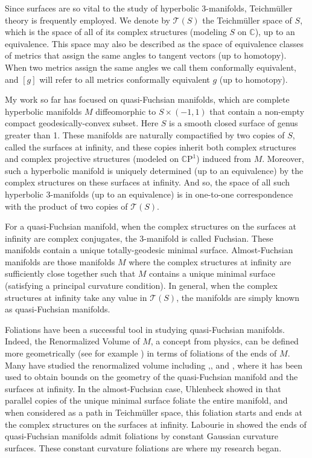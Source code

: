 \documentclass[11pt]{amsart}
\newcommand{\C}{\mathbb{C}}
\newcommand{\CP}{\mathbb{C}\mathrm{P}}
\begin{document}
Since surfaces are so vital to the study of hyperbolic 3-manifolds, Teichm\"uller theory is frequently employed. 
We denote by $\mathcal{T}(S)$ the Teichm\"uller space of $S$, which is the space of all of its complex structures (modeling $S$ on $\C$), up to an equivalence. 
This space may also be described as the space of equivalence classes of metrics that assign the same angles to tangent vectors (up to homotopy). 
When two metrics assign the same angles we call them conformally equivalent, and $[g]$ will refer to all metrics conformally equivalent $g$ (up to homotopy).


My work so far has focused on quasi-Fuchsian manifolds, which are complete hyperbolic manifolds $M$ diffeomorphic to $S \times (-1,1)$ that contain a non-empty compact geodesically-convex subset. 
Here $S$ is a smooth closed surface of genus greater than 1. 
These manifolds are naturally compactified by two copies of $S$, called the surfaces at infinity, and these copies inherit both complex structures and complex projective structures (modeled on $\CP^1$) induced from $M$. 
Moreover, such a hyperbolic manifold is uniquely determined (up to an equivalence) by the complex structures on these surfaces at infinity. 
And so, the space of all such hyperbolic 3-manifolds (up to an equivalence) is in one-to-one correspondence with the product of two copies of $\mathcal{T}(S)$.


For a quasi-Fuchsian manifold, when the complex structures on the surfaces at infinity are complex conjugates, the 3-manifold is called Fuchsian. 
These manifolds contain a unique totally-geodesic minimal surface. 
Almost-Fuchsian manifolds are those manifolds $M$ where the complex structures at infinity are sufficiently close together such that $M$ contains a unique minimal surface (satisfying a principal curvature condition). 
In general, when the complex structures at infinity take any value in $\mathcal{T}(S)$, the manifolds are simply known as quasi-Fuchsian manifolds. 

Foliations have been a successful tool in studying quasi-Fuchsian manifolds.
Indeed, the Renormalized Volume of $M$, a concept from physics, can be defined more geometrically (see for example \cite{krasnov-schlenker2008}) in terms of foliations of the ends of $M$. 
Many have studied the renormalized volume including \cite{schlenker2013},\cite{ciobotaru-moroianu2016}, and \cite{bridgeman-brock-bromberg2019}, where it has been used to obtain bounds on the geometry of the quasi-Fuchsian manifold and the surfaces at infinity. 
In the almost-Fuchsian case, Uhlenbeck showed in \cite{uhlenbeck1983} that parallel copies of the unique minimal surface foliate the entire manifold, and when considered as a path in Teichm\"uller space, this foliation starts and ends at the complex structures on the surfaces at infinity. 
Labourie in \cite{labourie1991} showed the ends of quasi-Fuchsian manifolds admit foliations by constant Gaussian curvature surfaces. 
These constant curvature foliations are where my research began.
\end{document}
